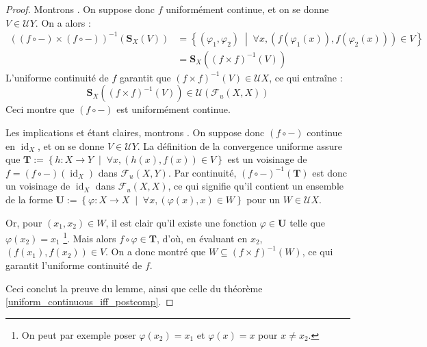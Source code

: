 \documentclass[a4paper,12pt]{article}
\newcommand{\set}[1]{\left\{ #1 \right\}}
\newcommand{\tq}{\;\middle|\;}
\newcommand{\inv}{^{-1}}
\newcommand{\comp}{\circ}
\renewcommand{\implies}{\Rightarrow}
\newcommand{\blank}{{-}}
\DeclareMathOperator{\id}{id}
\begin{document}
\begin{proof}
    Montrons \framebox{$(i)\implies(ii)$}. On suppose donc $f$ uniformément continue, et on se donne $V\in\mathcal{U}Y$. On a alors :
    \begin{align*}
        ((f\comp\blank)\times(f\comp\blank))\inv(\mathbf{S}_X(V)) 
            &= \set{(\varphi_1, \varphi_2)\tq\forall x, (f(\varphi_1(x)), f(\varphi_2(x)))\in V} \\
            &= \mathbf{S}_X((f\times f)\inv(V))
    \end{align*}
    L'uniforme continuité de $f$ garantit que $(f\times f)\inv(V)\in\mathcal{U}X$, ce qui entraîne :
    \begin{equation*}
        \mathbf{S}_X((f\times f)\inv(V))\in\mathcal{U}(\mathcal{F}_u(X, X))
    \end{equation*}
    Ceci montre que $(f\comp\blank)$ est uniformément continue.

    Les implications \framebox{$(ii)\implies(iii)$} et \framebox{$(iii)\implies(iv)$} étant claires, montrons
    \framebox{$(iv)\implies(i)$}. On suppose donc $(f\comp\blank)$ continue en $\id_X$, et on se donne 
    $V\in\mathcal{U}Y$. La définition de la convergence uniforme assure que 
    $\mathbf{T}:=\set{h : X\to Y\tq \forall x, (h(x), f(x))\in V}$ est un voisinage de $f = (f\comp\blank)(\id_X)$ dans 
    $\mathcal{F}_u(X, Y)$. Par continuité, $(f\comp\blank)\inv(\mathbf{T})$ est donc un voisinage de $\id_X$ dans $\mathcal{F}_u(X, X)$,
    ce qui signifie qu'il contient un ensemble de la forme $\mathbf{U}:=\set{\varphi : X\to X\tq \forall x, (\varphi(x), x)\in W}$ pour 
    un $W\in\mathcal{U}X$. 
    
    Or, pour $(x_1, x_2)\in W$, il est clair qu'il existe une fonction $\varphi\in\mathbf{U}$ telle que $\varphi(x_2) = x_1$
    \footnote{On peut par exemple poser $\varphi(x_2)=x_1$ et $\varphi(x) = x$ pour $x\ne x_2$.}.
    Mais alors $f\comp\varphi\in\mathbf{T}$, d'où, en évaluant en $x_2$, $(f(x_1),f(x_2))\in V$.
    On a donc montré que $W\subseteq (f\times f)\inv(W)$, ce qui garantit l'uniforme continuité de $f$.

    Ceci conclut la preuve du lemme, ainsi que celle du théorème \ref{uniform_continuous_iff_postcomp}.
\end{proof}
\end{document}
